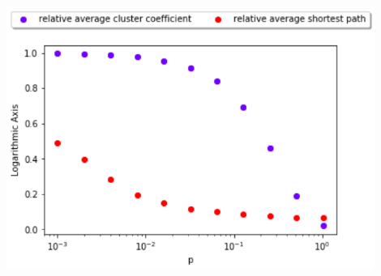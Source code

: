 \documentclass[a4paper,12pt]{article}
\begin{document}
\begin{itemize}
\begin{minipage}{\linewidth}
\centering
\includegraphics[width=12cm]{assets/relative.png}
\end{minipage}\hfill
\end{itemize}
\end{document}
